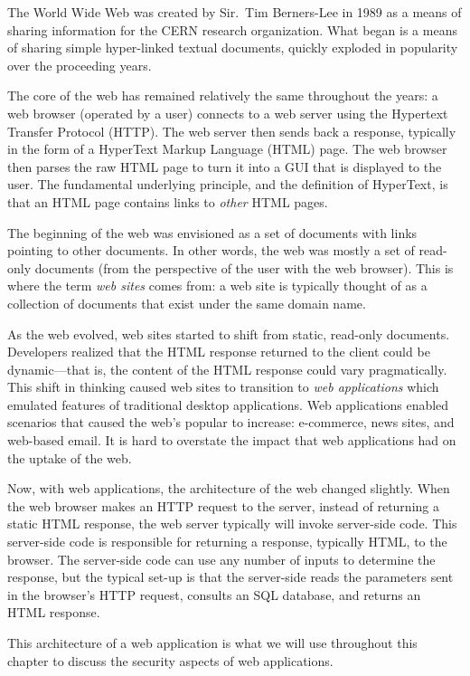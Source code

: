 The World Wide Web was created by Sir.\ Tim Berners-Lee in 1989 as a
means of sharing information for the CERN research organization. What
began is a means of sharing simple hyper-linked textual documents,
quickly exploded in popularity over the proceeding years.

The core of the web has remained relatively the same throughout the
years: a web browser (operated by a user) connects to a web server
using the Hypertext Transfer Protocol (HTTP). The web server then
sends back a response, typically in the form of a HyperText Markup
Language (HTML) page. The web browser then parses the raw HTML page to
turn it into a GUI that is displayed to the user. The fundamental
underlying principle, and the definition of HyperText, is that an HTML
page contains links to \emph{other} HTML pages.

The beginning of the web was envisioned as a set of documents with
links pointing to other documents. In other words, the web was mostly
a set of read-only documents (from the perspective of the user with
the web browser). This is where the term \emph{web sites} comes from:
a web site is typically thought of as a collection of documents that
exist under the same domain name.

As the web evolved, web sites started to shift from static, read-only
documents. Developers realized that the HTML response returned to the
client could be dynamic---that is, the content of the HTML response
could vary pragmatically. This shift in thinking caused web sites to
transition to \emph{web applications} which emulated features of
traditional desktop applications. Web applications enabled scenarios
that caused the web's popular to increase: e-commerce, news sites, and
web-based email. It is hard to overstate the impact that web
applications had on the uptake of the web. 

Now, with web applications, the architecture of the web changed
slightly. When the web browser makes an HTTP request to the server,
instead of returning a static HTML response, the web server typically
will invoke server-side code. This server-side code is responsible for
returning a response, typically HTML, to the browser. The server-side
code can use any number of inputs to determine the response, but the
typical set-up is that the server-side reads the parameters sent in
the browser's HTTP request, consults an SQL database, and returns an
HTML response. 

This architecture of a web application is what we will use throughout
this chapter to discuss the security aspects of web applications.

